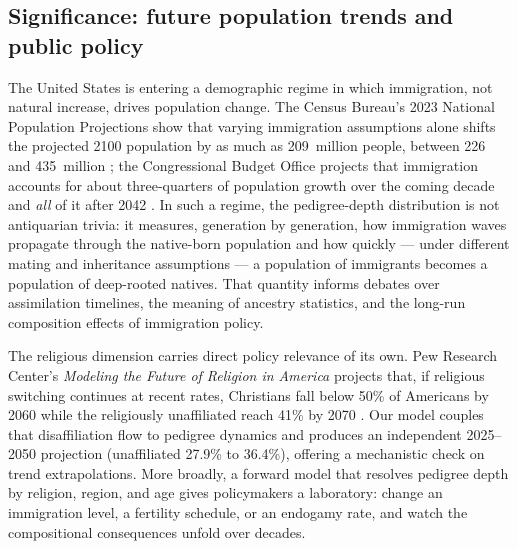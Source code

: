 \documentclass[11pt,a4paper]{article}
\begin{document}
\subsection{Significance: future population trends and public policy}
The United States is entering a demographic regime in which immigration,
not natural increase, drives population change.  The Census Bureau's
2023 National Population Projections show that varying immigration
assumptions alone shifts the projected 2100 population by as much as
209~million people, between 226 and 435~million
\cite{census-projections-2023}; the Congressional Budget Office projects
that immigration accounts for about three-quarters of population growth
over the coming decade and \emph{all} of it after 2042
\cite{cbo-demographic-2023}.  In such a regime, the pedigree-depth
distribution is not antiquarian trivia: it measures, generation by
generation, how immigration waves propagate through the native-born
population and how quickly --- under different mating and inheritance
assumptions --- a population of immigrants becomes a population of
deep-rooted natives.  That quantity informs debates over assimilation
timelines, the meaning of ancestry statistics, and the long-run
composition effects of immigration policy.

The religious dimension carries direct policy relevance of its own.
Pew Research Center's \textit{Modeling the Future of Religion in
America} projects that, if religious switching continues at recent
rates, Christians fall below 50\% of Americans by 2060 while the
religiously unaffiliated reach 41\% by 2070 \cite{pew-religion-2022}.
Our model couples that disaffiliation flow to pedigree dynamics and
produces an independent 2025--2050 projection (unaffiliated 27.9\% to
36.4\%), offering a mechanistic check on trend extrapolations.  More
broadly, a forward model that resolves pedigree depth by religion,
region, and age gives policymakers a laboratory: change an immigration
level, a fertility schedule, or an endogamy rate, and watch the
compositional consequences unfold over decades.
\end{document}
